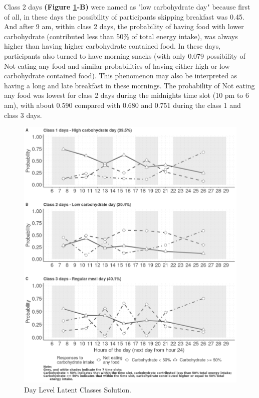 Class 2 days \textbf{(Figure \ref{fig:level1}-B)} were named as "low carbohydrate day" because first of all, in these days the possibility of participants skipping breakfast was 0.45. And after 9 am, within class 2 days, the probability of having food with lower carbohydrate (contributed less than 50\% of total energy intake), was always higher than having higher carbohydrate contained food. In these days, participants also turned to have morning snacks (with only 0.079 possibility of Not eating any food and similar probabilities of having either high or low carbohydrate contained food). This phenomenon may also be interpreted as having a long and late breakfast in these mornings. The probability of Not eating any food was lowest for class 2 days during the midnights time slot (10 pm to 6 am), with about 0.590 compared with 0.680 and 0.751 during the class 1 and class 3 days. 





\begin{figure}[H]
	\centering
	\includegraphics[width=14cm]{Figures/level1.png}
	\decoRule
	\caption[Day Level Latent Class Solution.]{Day Level Latent Classes Solution.}
	\label{fig:level1}
\end{figure}
\vspace{-0.6cm}

